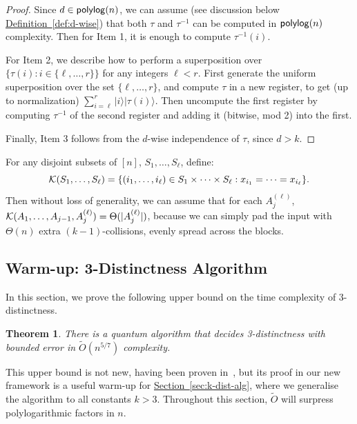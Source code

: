 \documentclass{article}
\newtheorem{theorem}{Theorem}\newtheorem{lemma}[theorem]{Lemma}\newtheorem{proposition}[theorem]{Proposition}\newtheorem{corollary}[theorem]{Corollary}\newtheorem{definition}[theorem]{Definition}\newtheorem{claim}[theorem]{Claim}\newtheorem{remark}[theorem]{Remark}\newenvironment{cfigure}[1][htbp]{\begin{figure}[#1]\centering}{\end{figure}}
\renewcommand{\sec}[1]{\hyperref[sec:#1]{Section~\ref*{sec:#1}}}
\newcommand{\defin}[1]{\hyperref[def:#1]{Definition~\ref*{def:#1}}}
\def\ket#1{{\lvert}#1\rangle}
\renewcommand{\>}{\rangle}
\newcommand{\<}{\langle}
\renewcommand{\(}{\left(}
\renewcommand{\)}{\right)}
\begin{document}
\begin{proof}
Since $d\in{\sf polylog}(n)$, we can assume (see discussion below \defin{d-wise}) that both $\tau$ and $\tau^{-1}$ can be computed in ${\sf polylog}(n)$ complexity. Then for Item 1, it is enough to compute $\tau^{-1}(i)$. 

For Item 2, we describe how to perform a superposition over $\{\tau(i):i\in \{\ell,\dots, r\}\}$ for any integers ${\ell}<r$. First generate the uniform superposition over the set $\{\ell,\dots,r\}$, and compute $\tau$ in a new register, to get (up to normalization)
$\sum_{i=\ell}^r\ket{i}\ket{\tau(i)}$.
Then uncompute the first register by computing $\tau^{-1}$ of the second register and adding it (bitwise, mod 2) into the first. 

Finally, Item 3 follows from the $d$-wise independence of $\tau$, since $d>k$. 
\end{proof}
\noindent For any disjoint subsets of $[n]$, $S_1,\dots,S_{\ell}$, define:
\begin{equation}
	{\cal K}(S_1,\dots,S_{\ell})=\{(i_1,\dots,i_{\ell})\in S_1\times\dots\times S_{\ell}: x_{i_1}=\dots=x_{i_{\ell}}\}.\label{eq:collision-set}
\end{equation}
Then without loss of generality, we can assume that for each $A_j^{(\ell)}$, ${\cal K}(A_1,\dots,A_{j-1},A_j^{(\ell)})=\Theta(|A_j^{(\ell)}|)$, because we can simply pad the input with $\Theta(n)$ extra $(k-1)$-collisions, evenly spread across the blocks.
                                                                                                                                                                                                                                                                                                                                                                                                                                                                                                                                                                                                                   


\subsection{Warm-up: 3-Distinctness Algorithm}\label{sec:3-dist}

In this section, we prove the following upper bound on the time complexity of $3$-distinctness.
\begin{theorem}\label{thm:3-dist}
There is a quantum algorithm that decides 3-distinctness with bounded error in $\widetilde{O}(n^{5/7})$ complexity.
\end{theorem}
\noindent This upper bound is not new, having been proven in~\cite{belovs2013TimeEfficientQW3Distintness}, but its proof in our new framework is a useful warm-up for \sec{k-dist-alg}, where we generalise the algorithm to all constants $k>3$. Throughout this section, $\widetilde{O}$ will surpress polylogarithmic factors in $n$. 
\end{document}
